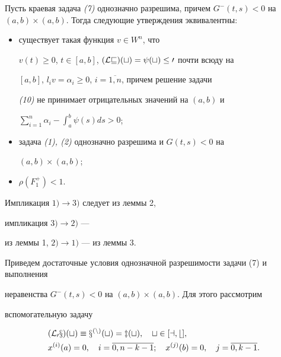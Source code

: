  


\begin{thm} Пусть краевая задача {\em (7)} однозначно разрешима, причем $G^-


(t,s)<0$ на $(a,b)\times(a,b)$. Тогда следующие утверждения эквивалентны: 


\begin{itemize} 


\item[1)] существует такая функция $v\in W^n$, что 


$v(t)\ge 0$, $t\in[a,b]$, $(\cal Lv)(t)=\psi(t)\le 0$ почти всюду на 


$[a,b]$, $l_iv=\alpha_i\ge 0$, $i=\overline{1,n}$, причем решение задачи 


{\em (10)} не принимает отрицательных значений на $(a,b)$ и 


$\sum^n_{i=1}\alpha_i-\int^b_a\psi(s)ds>0$; 


\item[2)] задача {\em (1), (2)} однозначно разрешима и $G(t,s)<0$ на 


$(a,b)\times(a,b)$; 


\item[3)] $\rho(F^+_1)<1$. 


\end{itemize}


\end{thm} 


 


\begin{pf} Импликация $1)\longrightarrow 3)$ следует из леммы 2, 


импликация $3)\longrightarrow 2)$ --- 


из леммы 1, $2)\longrightarrow 1)$ --- из леммы 3. 


\end{pf} 


 


Приведем достаточные условия однозначной разрешимости задачи (7) и выполнения 


неравенства $G^-(t,s)<0$ на $(a,b)\times(a,b)$. Для этого рассмотрим 


вспомогательную задачу 


\begin{align} 


\begin{split} 


& (\cal L_0x)(t)\equiv x^{(n)}(t)=z(t),\quad t\in[a,b],\\ 


& x^{(i)}(a)=0,\quad i=\overline{0,n-k-1};\quad x^{(j)}(b)=0, 


\quad j=\overline{0,k-1}. 


\end{split} 


\end{align} 


